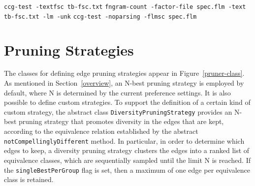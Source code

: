 \documentclass[11pt]{article}
\newcommand{\code}[1]{\texttt{#1}} %
\begin{document}
\begin{exe}
  \ex 
  \begin{xlist}
  \ex \label{ex:export-fsc} 
  \code{ccg-test -textfsc tb-fsc.txt}
  \ex \label{ex:make-flmsc} 
  \code{fngram-count -factor-file spec.flm -text tb-fsc.txt -lm -unk}
  \ex \label{ex:test-flm}
  \code{ccg-test -noparsing -flmsc spec.flm}
  \end{xlist}
\end{exe}


\section{Pruning Strategies}
\label{pruning}

The classes for defining edge pruning strategies appear in
Figure~\ref{pruner-class}. As mentioned in Section~\ref{overview}, an N-best
pruning strategy is employed by default, where N is determined by the
current preference settings. It is also possible to define custom
strategies. To support the definition of a certain kind of custom
strategy, the abstract class \code{Diversity\-Pruning\-Strategy}
provides an N-best pruning strategy that promotes diversity in the edges
that are kept, according to the equivalence relation established by the
abstract \code{not\-Compellingly\-Different} method. In particular, in
order to determine which edges to keep, a diversity pruning strategy
clusters the edges into a ranked list of equivalence classes, which are
sequentially sampled until the limit N is reached. If the
\code{single\-Best\-Per\-Group} flag is set, then a maximum of one edge
per equivalence class is retained.
\end{document}
